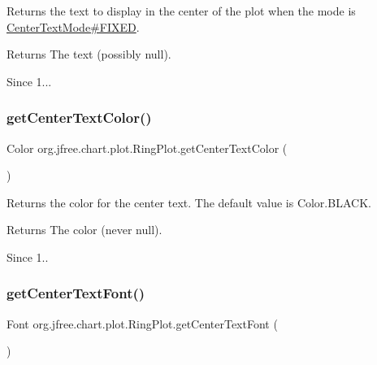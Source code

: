 Returns the text to display in the center of the plot when the mode is \mbox{\hyperlink{enumorg_1_1jfree_1_1chart_1_1plot_1_1_center_text_mode_a28a61a12d960a2ebea64f911c59177cc}{Center\+Text\+Mode\#\+F\+I\+X\+ED}}.

\begin{DoxyReturn}{Returns}
The text (possibly {\ttfamily null}).
\end{DoxyReturn}
\begin{DoxySince}{Since}
1... 
\end{DoxySince}
\mbox{\label{classorg_1_1jfree_1_1chart_1_1plot_1_1_ring_plot_a8336b323aca0d3a58b5d84e1dd014e59}} 
\subsubsection{\texorpdfstring{get\+Center\+Text\+Color()}{getCenterTextColor()}}
{\footnotesize\ttfamily Color org.\+jfree.\+chart.\+plot.\+Ring\+Plot.\+get\+Center\+Text\+Color (\begin{DoxyParamCaption}{ }\end{DoxyParamCaption})}

Returns the color for the center text. The default value is {\ttfamily Color.\+B\+L\+A\+CK}.

\begin{DoxyReturn}{Returns}
The color (never {\ttfamily null}).
\end{DoxyReturn}
\begin{DoxySince}{Since}
1.. 
\end{DoxySince}
\mbox{\label{classorg_1_1jfree_1_1chart_1_1plot_1_1_ring_plot_a0eb37bf799886dcb40095966caf71fa1}} 
\subsubsection{\texorpdfstring{get\+Center\+Text\+Font()}{getCenterTextFont()}}
{\footnotesize\ttfamily Font org.\+jfree.\+chart.\+plot.\+Ring\+Plot.\+get\+Center\+Text\+Font (\begin{DoxyParamCaption}{ }\end{DoxyParamCaption})}

